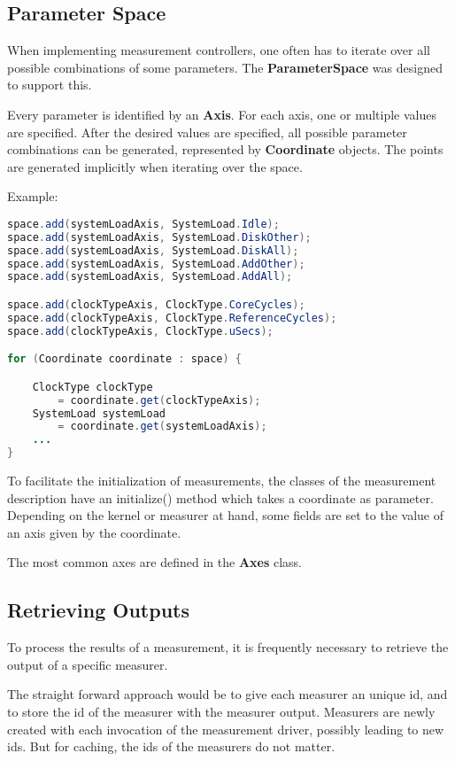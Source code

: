\documentclass[a4paper,12pt]{report}
\newcommand{\class}[1]{\textbf{#1}}
\newcommand{\method}[1]{\textsf{#1}}
\begin{document}
\subsection{Parameter Space}
When implementing measurement controllers, one often has to iterate over all
possible combinations of some parameters. The \class{ParameterSpace} was
designed to support this. 

Every parameter is identified by an \class{Axis}. For
each axis, one or multiple values are specified. After the desired values are
specified, all possible parameter combinations can be generated, represented by
\class{Coordinate} objects. The points are generated implicitly when iterating
over the space.

Example:
\begin{lstlisting}[language=Java]
space.add(systemLoadAxis, SystemLoad.Idle);
space.add(systemLoadAxis, SystemLoad.DiskOther);
space.add(systemLoadAxis, SystemLoad.DiskAll);
space.add(systemLoadAxis, SystemLoad.AddOther);
space.add(systemLoadAxis, SystemLoad.AddAll);

space.add(clockTypeAxis, ClockType.CoreCycles);
space.add(clockTypeAxis, ClockType.ReferenceCycles);
space.add(clockTypeAxis, ClockType.uSecs);

for (Coordinate coordinate : space) {

	ClockType clockType 
		= coordinate.get(clockTypeAxis);
	SystemLoad systemLoad 
		= coordinate.get(systemLoadAxis);
	...
}			
\end{lstlisting}

To facilitate the initialization of measurements, the classes of the measurement
description have an \method{initialize()} method which takes a coordinate as
parameter. Depending on the kernel or measurer at hand, some fields are
set to the value of an axis given by the coordinate.

The most common axes are defined in the \class{Axes} class.

\subsection{Retrieving Outputs}
To process the results of a measurement, it is frequently necessary to
retrieve the output of a specific measurer. 

The straight forward approach would be to give each measurer an unique id, and
to store the id of the measurer with the measurer output. Measurers are newly
created with each invocation of the measurement driver, possibly leading to new
ids. But for caching, the ids of the measurers do not matter.
\end{document}
